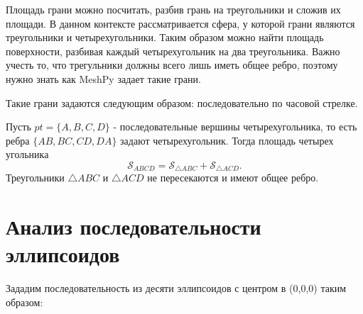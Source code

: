 Площадь грани можно посчитать, разбив грань на треугольники и сложив их площади. В данном контексте рассматривается сфера, у которой грани являются треугольники и четырехугольники. Таким образом можно найти площадь поверхности, разбивая каждый четырехугольник на два треугольника. Важно учесть то, что трегульники должны всего лишь иметь общее ребро, поэтому нужно знать как MeshPy задает такие грани.

Такие грани задаются следующим образом: последовательно по часовой стрелке.

Пусть $pt = \{A,B,C,D\} $ - последовательные вершины четырехугольника, то есть ребра $\{AB,BC,CD,DA\}$ задают четырехугольник. Тогда площадь четырех угольника 
$$\mathscr{S}_{ABCD} = \mathscr{S}_{\triangle ABC} +  \mathscr{S}_{\triangle ACD}.$$
Треугольники $\triangle ABC$ и $\triangle ACD$ не пересекаются и имеют общее ребро. 
\section{Анализ последовательности эллипсоидов}
Зададим последовательность из десяти эллипсоидов с центром в (0,0,0) таким образом: 

